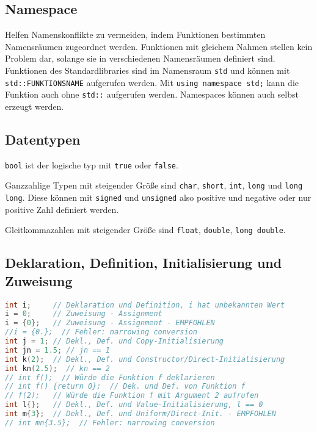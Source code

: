 \documentclass[10pt,twocolumn]{scrartcl}
\begin{document}
\subsection{Namespace}

Helfen Namenskonflikte zu vermeiden, indem Funktionen bestimmten Namensräumen
zugeordnet werden. Funktionen mit gleichem Nahmen stellen kein Problem dar,
solange sie in verschiedenen Namensräumen definiert sind. Funktionen des
Standardlibraries sind im Namensraum \lstinline|std| und können mit
\lstinline|std::FUNKTIONSNAME| aufgerufen werden. Mit
\lstinline|using namespace std;| kann die Funktion auch ohne \lstinline|std::|
aufgerufen werden. Namespaces können auch selbst erzeugt werden.

\subsection{Datentypen}

\lstinline|bool| ist der logische typ mit \lstinline|true| oder
\lstinline|false|.

Ganzzahlige Typen mit steigender Größe sind \lstinline|char|, \lstinline|short|,
\lstinline|int|, \lstinline|long| und \lstinline|long long|. Diese können mit
\lstinline|signed| und \lstinline|unsigned| also positive und negative oder nur
positive Zahl definiert werden.

Gleitkommazahlen mit steigender Größe sind \lstinline|float|,
\lstinline|double|, \lstinline|long double|.

\subsection{Deklaration, Definition, Initialisierung und Zuweisung}

\begin{lstlisting}[language=C++]
int i;     // Deklaration und Definition, i hat unbekannten Wert
i = 0;     // Zuweisung - Assignment
i = {0};   // Zuweisung - Assignment - EMPFOHLEN
//i = {0.};  // Fehler: narrowing conversion
int j = 1; // Dekl., Def. und Copy-Initialisierung
int jn = 1.5; // jn == 1
int k(2);  // Dekl., Def. und Constructor/Direct-Initialisierung
int kn(2.5);  // kn == 2
// int f();  // Würde die Funktion f deklarieren
// int f() {return 0};  // Dek. und Def. von Funktion f
// f(2);   // Würde die Funktion f mit Argument 2 aufrufen
int l{};   // Dekl., Def. und Value-Initialisierung, l == 0
int m{3};  // Dekl., Def. und Uniform/Direct-Init. - EMPFOHLEN
// int mn{3.5};  // Fehler: narrowing conversion
\end{lstlisting}
\end{document}
